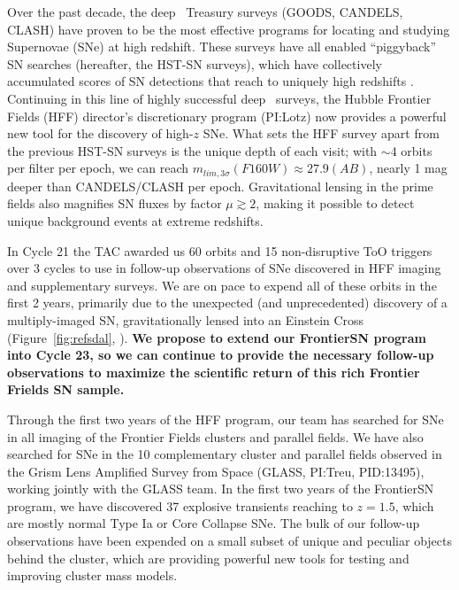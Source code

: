 \documentclass[12pt]{article}
\begin{document}
%
%
\justification          %

Over the past decade, the deep \HST\ Treasury surveys (GOODS, CANDELS,
CLASH) have proven to be the most effective programs for locating and
studying Supernovae (SNe) at high redshift.  These surveys have all
enabled ``piggyback'' SN searches (hereafter, the HST-SN surveys),
which have collectively accumulated scores of SN detections that reach
to uniquely high redshifts
\citep{Riess:2007,Dahlen:2008,Graur:2014a,Rodney:2014}.  Continuing in
this line of highly successful deep \HST\ surveys, the Hubble Frontier
Fields (HFF) director's discretionary program (PI:Lotz) now provides a
powerful new tool for the discovery of high-$z$ SNe.  What sets the
HFF survey apart from the previous HST-SN surveys is the unique depth
of each visit; with $\sim$4 orbits per filter per epoch, we can reach
$m_{lim,3\sigma}(F160W)\approx27.9 (AB)$, nearly 1 mag deeper than
CANDELS/CLASH per epoch. Gravitational lensing in the prime fields
also magnifies SN fluxes by factor $\mu\gtrsim2$, making it possible
to detect unique background events at extreme redshifts. 

In Cycle 21 the TAC awarded us 60 orbits and 15 non-disruptive ToO
triggers over 3 cycles to use in follow-up observations of SNe
discovered in HFF imaging and supplementary surveys. We are on pace to
expend all of these orbits in the first 2 years, primarily due to the
unexpected (and unprecedented) discovery of a multiply-imaged SN,
gravitationally lensed into an Einstein Cross
(Figure~\ref{fig:refsdal}, \citealt{Kelly:2015}).  {\bf We propose to
  extend our FrontierSN program into Cycle 23, so we can continue to
  provide the necessary follow-up observations to maximize the
  scientific return of this rich Frontier Frields SN sample.}

\smallskip
{} 
Through the first two years of the HFF program, our team has searched
for SNe in all imaging of the Frontier Fields clusters and parallel
fields.  We have also searched for SNe in the 10 complementary cluster
and parallel fields observed in the Grism Lens Amplified Survey from
Space (GLASS, PI:Treu, PID:13495), working jointly with the GLASS
team.  In the first two years of the FrontierSN program, we have
discovered 37 explosive transients reaching to $z=1.5$, which are
mostly normal Type Ia or Core Collapse SNe.  The bulk of our follow-up
observations have been expended on a small subset of unique and
peculiar objects behind the cluster, which are providing powerful new
tools for testing and improving cluster mass models.
\end{document}
